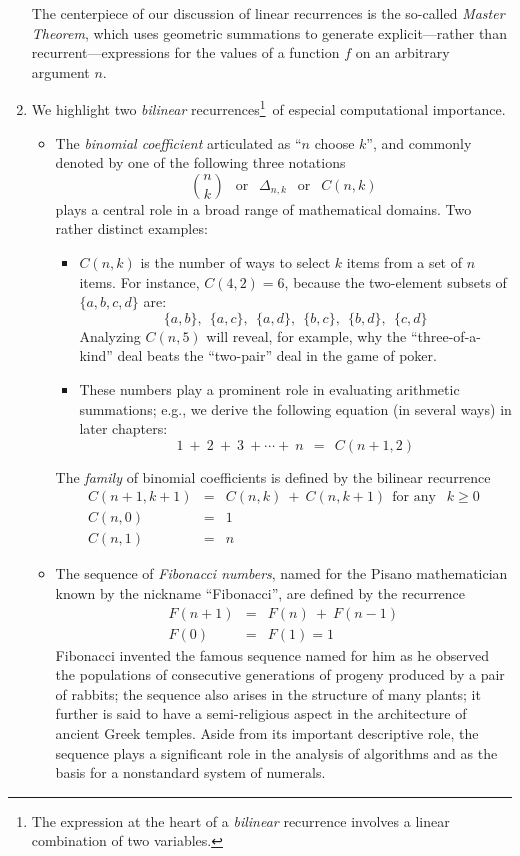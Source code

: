 \begin{enumerate}
\smallskip

The centerpiece of our discussion of linear recurrences is the so-called {\em Master Theorem}, which uses geometric summations to generate explicit---rather than recurrent---expressions for the values of a function $f$ on an arbitrary argument $n$.

\medskip\item
We highlight two {\it bilinear} recurrences\footnote{The expression at the heart of a {\it bilinear} recurrence involves a linear combination of two variables.}~of especial computational importance. 
  \begin{itemize} 
  \item
The {\it binomial coefficient} articulated as ``$n$ choose $k$'', and commonly denoted by one of the following three notations
\[ {n \choose k} \ \ \mbox{ or } \ \ \Delta_{n,k} \ \ \mbox{ or } \ \ C(n,k) \]
plays a central role in a broad range of mathematical domains.  Two rather distinct examples:
       \begin{itemize}
       \item
$C(n,k)$ is the number of ways to select $k$ items from a set of $n$ items.  For instance, $C(4,2) =6$, because the two-element subsets of $\{a, b, c, d\}$ are: 
\[ \{a, b\}, \ \ \{a, c\}, \ \ \{a, d\}, \ \ \{b, c\}, \ \ \{b, d\}, \ \ \{c,d\} \]
Analyzing $C(n, 5)$ will reveal, for example, why the ``three-of-a-kind'' deal beats the ``two-pair'' deal in the game of poker.
       \medskip\item
These numbers play a prominent role in evaluating arithmetic summations; e.g., we derive the following equation (in several ways) in later chapters:
\[ 1 \ + \ 2 \ + \ 3 \ + \cdots + \ n \ \ = \ \ C(n+1, 2) \]
       \end{itemize}
The {\em family} of binomial coefficients is defined by the bilinear recurrence
\begin{eqnarray*}
C(n+1, k+1) & = & C(n, k) \ + \ C(n, k+1) \ \ \mbox{for any } \ \ k \geq 0 \\
C(n, 0) & = & 1 \\
C(n, 1) & = & n 
\end{eqnarray*}

  \medskip\item
The sequence of {\it Fibonacci numbers}, named for the Pisano mathematician known by the nickname ``Fibonacci'', are defined by the recurrence
\begin{eqnarray*}
F(n+1) & = & F(n) \ + \ F(n-1) \\
F(0) & = & F(1) = 1
\end{eqnarray*}
Fibonacci invented the famous sequence named for him as he observed the populations of consecutive generations of progeny produced by a pair of rabbits; the sequence also arises in the structure of many plants; it further is said to have a semi-religious aspect in the architecture
of ancient Greek temples.  Aside from its important descriptive role, the sequence plays a
significant role in the analysis of algorithms and as the basis for a nonstandard system of numerals.
  \end{itemize}
\end{enumerate}
